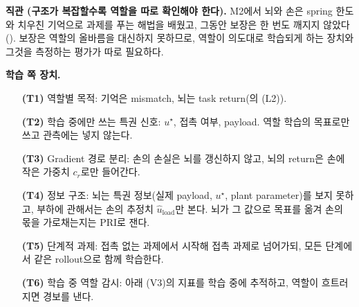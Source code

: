 \documentclass[11pt]{article}\usepackage[margin=1in]{geometry}\usepackage{amsmath,amssymb,amsthm,mathtools}\usepackage{graphicx}\graphicspath{{figures/}{../figures/}{figs/}{./}}\usepackage{enumitem}\usepackage{hyperref}\usepackage{cleveref}\usepackage{tikz}\usetikzlibrary{arrows.meta,positioning,calc,shapes.geometric}\usepackage{float}\usepackage{rotating}\usepackage[most]{tcolorbox}\usepackage{kotex}\usepackage{booktabs}\usepackage{longtable}\emergencystretch=1.6em\tolerance=2000 \crefname{assumption}{Assumption}{Assumptions}\Crefname{assumption}{Assumption}{Assumptions}\crefname{definition}{Definition}{Definitions}\Crefname{definition}{Definition}{Definitions}\crefname{proposition}{Proposition}{Propositions}\Crefname{proposition}{Proposition}{Propositions}\crefname{fact}{Fact}{Facts}\Crefname{fact}{Fact}{Facts} \newtheorem{assumption}{Assumption}\newtheorem{definition}{Definition}\newtheorem{lemma}{Lemma}\newtheorem{proposition}{Proposition}\newtheorem{theorem}{Theorem}\newtheorem{corollary}{Corollary}\newtheorem{fact}{Fact}\theoremstyle{remark}\newtheorem{remark}{Remark} \newcommand{\R}{\mathbb{R}}\newcommand{\xb}{\bar x}\newcommand{\Ab}{\bar A}\newcommand{\By}{\bar B_y}\newcommand{\U}{\mathcal U}\newcommand{\Z}{\mathcal Z}
\begin{document}
\textbf{직관 (구조가 복잡할수록 역할을 따로 확인해야 한다).} M2에서 뇌와 손은 spring 한도와 치우친 기억으로 과제를 푸는 해법을 배웠고, 그동안 보장은 한 번도 깨지지 않았다(). 보장은 역할의 올바름을 대신하지 못하므로, 역할이 의도대로 학습되게 하는 장치와 그것을 측정하는 평가가 따로 필요하다.

\textbf{학습 쪽 장치.}
\begin{itemize}
\item[\textbf{(T1)}] 역할별 목적: 기억은 mismatch, 뇌는 task return(의 (L2)).
\item[\textbf{(T2)}] 학습 중에만 쓰는 특권 신호: $u^\star$, 접촉 여부, payload. 역할 학습의 목표로만 쓰고 관측에는 넣지 않는다.
\item[\textbf{(T3)}] Gradient 경로 분리: 손의 손실은 뇌를 갱신하지 않고, 뇌의 return은 손에 작은 가중치 $c_r$로만 들어간다.
\item[\textbf{(T4)}] 정보 구조: 뇌는 특권 정보(실제 payload, $u^\star$, plant parameter)를 보지 못하고, 부하에 관해서는 손의 추정치 $\hat u_{\mathrm{load}}$만 본다. 뇌가 그 값으로 목표를 옮겨 손의 몫을 가로채는지는 PRI로 잰다.
\item[\textbf{(T5)}] 단계적 과제: 접촉 없는 과제에서 시작해 접촉 과제로 넘어가되, 모든 단계에서 같은 rollout으로 함께 학습한다.
\item[\textbf{(T6)}] 학습 중 역할 감시: 아래 (V3)의 지표를 학습 중에 추적하고, 역할이 흐트러지면 경보를 낸다.
\end{itemize}
\end{document}
